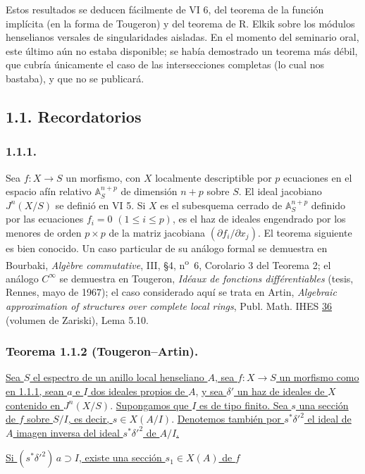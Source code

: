 Estos resultados se deducen fácilmente de VI 6, del teorema de la
función implícita (en la forma de Tougeron) y del teorema de R. Elkik
sobre los módulos henselianos versales de singularidades aisladas. En
el momento del seminario oral, este último aún no estaba disponible;
se había demostrado un teorema más débil, que cubría únicamente el caso
de las intersecciones completas (lo cual nos bastaba), y que no se
publicará.

\subsection*{1.1. Recordatorios}

\subsubsection*{1.1.1.}
Sea $f:X\longrightarrow S$ un morfismo, con $X$ localmente descriptible
por $p$ ecuaciones en el espacio afín relativo $\mathbb A_S^{n+p}$ de
dimensión $n+p$ sobre $S$. El ideal jacobiano $J^n(X/S)$ se definió en
VI 5. Si $X$ es el subesquema cerrado de $\mathbb A_S^{n+p}$ definido
por las ecuaciones $f_i=0$ $(1\leq i\leq p)$, es el haz de ideales
engendrado por los menores de orden $p\times p$ de la matriz jacobiana
$(\partial f_i/\partial x_j)$. El teorema siguiente es bien conocido.
Un caso particular de su análogo formal se demuestra en Bourbaki,
\emph{Alg\`ebre commutative}, III, \S4, n\textsuperscript{o}~6,
Corolario 3 del Teorema 2; el análogo $C^\infty$ se demuestra en
Tougeron, \emph{Id\'eaux de fonctions diff\'erentiables} (tesis,
Rennes, mayo de 1967); el caso considerado aquí se trata en Artin,
\emph{Algebraic approximation of structures over complete local
rings}, Publ. Math. IHES \underline{36} (volumen de Zariski), Lema 5.10.

\subsubsection*{Teorema 1.1.2 (Tougeron--Artin).}
\underline{Sea $S$ el espectro de un anillo local henseliano $A$, sea
$f:X\to S$ un morfismo como en 1.1.1, sean $a$ e $I$ dos ideales
propios de $A$}, \underline{y sea $\delta'$ un haz de ideales de $X$ contenido en
$J^n(X/S)$}. \underline{Supongamos que $I$ es de tipo finito. Sea $s$ una sección
de $f$ sobre $S/I$, es decir, $s\in X(A/I)$}. \underline{Denotemos también por
$s^*\delta'^2$ el ideal de $A$ imagen inversa del ideal
$s^*\delta'^2$ de $A/I$.}

\underline{Si $(s^*\delta'^2)\,a\supset I$, existe una sección
$s_1\in X(A)$ de $f$}


